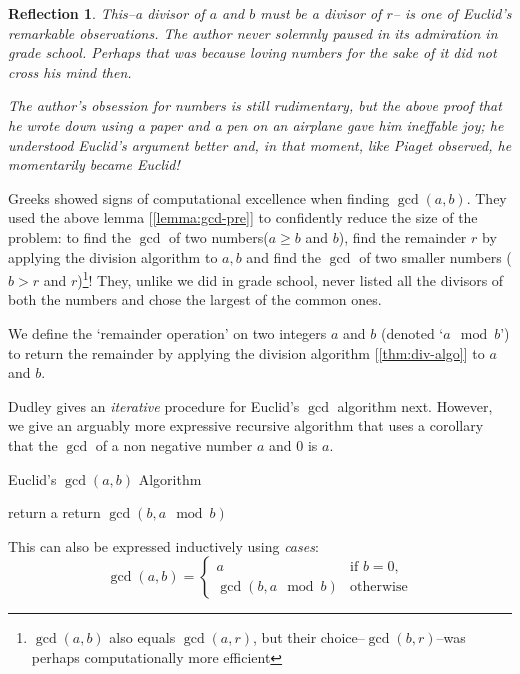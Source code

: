 \documentclass[english,notitlepage,smartquotes]{hgbreport}
\theoremstyle{definition}
\theoremstyle{remark}
\theoremstyle{plain}
\newtheorem{reflection}{Reflection}
\begin{document}
\begin{reflection}
This--a divisor of $a$ and $b$ must be a divisor of $r$-- is one of Euclid's remarkable observations. The author never solemnly paused in its admiration in grade school. Perhaps that was because loving numbers for the sake of it did not cross his mind then.

The author's obsession for numbers is still rudimentary, but the above proof that he wrote down using a paper and a pen on an airplane gave him ineffable joy; he understood Euclid's argument better and, in that moment, like Piaget \cite{Piaget1974} observed, he \emph{momentarily became Euclid}! 
\end{reflection}

Greeks showed signs of computational excellence when finding $\gcd(a,b)$. They used the above lemma [\ref{lemma:gcd-pre}] to confidently reduce the size of the problem: to find the $\gcd$ of two numbers($a\geq b$ and $b$), find the remainder $r$ by applying the division algorithm to $a,b$ and find the $\gcd$ of two smaller numbers ($b>r$ and $r$)\footnote{$\gcd(a,b)$ also equals $\gcd(a,r)$, but their choice--$\gcd(b,r)$--was perhaps computationally more efficient}! They, unlike we did in grade school, never listed all the divisors of both the numbers and chose the largest of the common ones.

We define the `remainder operation' on two integers $a$ and $b$ (denoted `$a\mod b$') to return the remainder by applying the division algorithm [\ref{thm:div-algo}] to $a$ and $b$.

Dudley gives an \emph{iterative} procedure for Euclid's $\gcd$ algorithm next. However, we give an arguably more expressive recursive algorithm that uses a corollary that the $\gcd$ of a non negative number $a$ and $0$ is $a$. 

\begin{algorithm}
\begin{algorithmic}
\caption{Euclid's $\gcd(a,b)$ Algorithm}
\label{alg:euclid}
    \State return a
  \Else
    \State return $\gcd(b,a\mod b)$
  \EndIf
\end{algorithmic}
\end{algorithm}

This can also be expressed inductively using \emph{cases}:
\[
\gcd(a,b)=
\begin{cases}
a& \text{if $b=0$}, \\
\gcd(b,a\mod b)& \text{otherwise}
\end{cases}
\]
\end{document}
